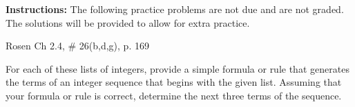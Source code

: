 \documentclass[12pt,addpoints]{exam}
\begin{document}
\extrawidth{0.5in} \extrafootheight{-0in} \pagestyle{headandfoot}
\headrule {} \footrule {}

\noindent \textbf{Instructions:} The following practice problems are
not due and are not graded.  The solutions will be provided to allow
for extra practice.

\begin{questions}
\printanswers

\question Rosen Ch 2.4, \# 26(b,d,g), p. 169
    \ifprintanswers
        \vspace{-10pt}
   \fi
\begin{solution}
For each of these lists of integers, provide a simple formula or rule that generates the terms of an integer sequence that begins with the given list.  Assuming that your formula or rule is correct, determine the next three terms of the sequence. \\


\end{solution}
\end{questions}
\end{document}
